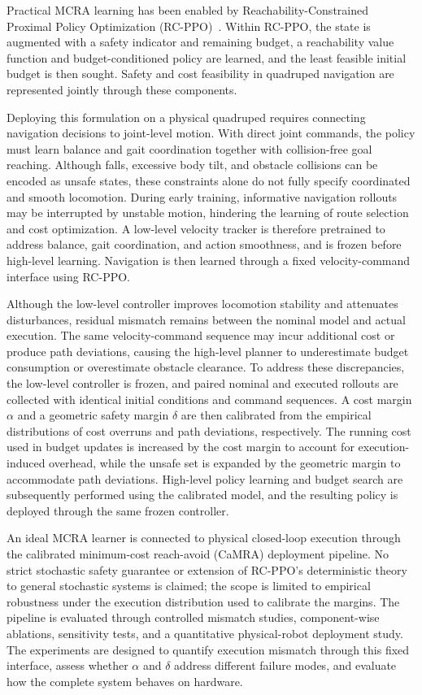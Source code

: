 \documentclass[conference]{IEEEtran}
\begin{document}
Practical MCRA learning has been enabled by Reachability-Constrained Proximal
Policy Optimization (RC-PPO)~\cite{so2024}.
Within RC-PPO, the state is augmented with a safety indicator and remaining budget,
a reachability value function and budget-conditioned policy are learned, and
the least feasible initial budget is then sought. Safety and cost feasibility in
quadruped navigation are represented jointly through these components.

Deploying this formulation on a physical quadruped requires connecting navigation
decisions to joint-level motion. With direct joint commands, the policy must learn
balance and gait coordination together with collision-free goal reaching. Although
falls, excessive body tilt, and obstacle collisions can be encoded as unsafe
states, these constraints alone do not fully specify coordinated and smooth
locomotion. During early training, informative navigation rollouts may be
interrupted by unstable motion, hindering the learning of route selection and
cost optimization. A low-level velocity tracker is therefore pretrained
to address balance, gait coordination, and action smoothness, and is frozen before
high-level learning. Navigation is then learned through a fixed velocity-command
interface using RC-PPO.

Although the low-level controller improves locomotion stability and attenuates
disturbances, residual mismatch remains between the nominal model and actual
execution. The same velocity-command sequence may incur additional cost or produce
path deviations, causing the high-level planner to underestimate budget
consumption or overestimate obstacle clearance. To address these discrepancies,
the low-level controller is frozen, and paired nominal and executed
rollouts are collected with identical initial conditions and command sequences. A
cost margin $\alpha$ and a geometric safety margin $\delta$ are then calibrated from the
empirical distributions of cost overruns and path deviations, respectively. The
running cost used in budget updates is increased by the cost margin to account for
execution-induced overhead, while the unsafe set is expanded by the geometric margin to
accommodate path deviations. High-level policy learning and budget search are
subsequently performed using the calibrated model, and the resulting policy is
deployed through the same frozen controller.

An ideal MCRA learner is connected to physical closed-loop execution through the
calibrated minimum-cost reach-avoid (CaMRA) deployment pipeline. No strict
stochastic safety guarantee or extension of RC-PPO's deterministic theory to general
stochastic systems is claimed; the scope is limited to empirical robustness under
the execution distribution used to calibrate the margins. The pipeline is evaluated
through controlled mismatch studies, component-wise ablations, sensitivity tests,
and a quantitative physical-robot deployment study. The experiments are designed to
quantify execution mismatch through this fixed interface, assess whether
$\alpha$ and $\delta$ address different failure modes, and evaluate how the
complete system behaves on hardware.
\end{document}
